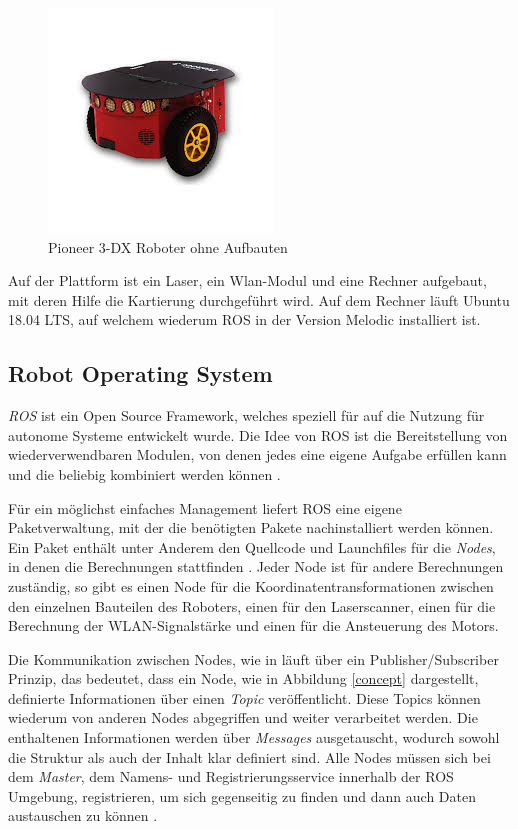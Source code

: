 \documentclass{scrartcl}%
\begin{document}
\begin{figure}[h]
	\centering
	\includegraphics{bilder/pioneerRoh.jpg}
	\caption{Pioneer 3-DX Roboter ohne Aufbauten \cite{pioneer}}
	\label{pioneerRoh}
\end{figure}

Auf der Plattform ist ein Laser, ein Wlan-Modul und eine Rechner aufgebaut, mit deren Hilfe die Kartierung durchgeführt wird. Auf dem Rechner läuft Ubuntu 18.04 LTS, auf welchem wiederum ROS in der Version Melodic installiert ist.

\subsection{Robot Operating System}
\textit{ROS} ist ein Open Source Framework, welches speziell für auf die Nutzung für autonome Systeme entwickelt wurde. Die Idee von ROS ist die Bereitstellung von wiederverwendbaren Modulen, von denen jedes eine eigene Aufgabe erfüllen kann und die beliebig kombiniert werden können \cite{rosIntro}.

Für ein möglichst einfaches Management liefert ROS eine eigene Paketverwaltung, mit der die benötigten Pakete nachinstalliert werden können. Ein Paket enthält unter Anderem den Quellcode und Launchfiles für die \textit{Nodes}, in denen die Berechnungen stattfinden \cite{rosIntro2}. Jeder Node ist für andere Berechnungen zuständig, so gibt es einen Node für die Koordinatentransformationen zwischen den einzelnen Bauteilen des Roboters, einen für den Laserscanner, einen für die Berechnung der WLAN-Signalstärke und einen für die Ansteuerung des Motors.

Die Kommunikation zwischen Nodes, wie in  läuft über ein Publisher/Subscriber Prinzip, das bedeutet, dass ein Node, wie in Abbildung \ref{concept} dargestellt, definierte Informationen über einen \textit{Topic} veröffentlicht. Diese Topics können wiederum von anderen Nodes abgegriffen und weiter verarbeitet werden. Die enthaltenen Informationen werden über \textit{Messages} ausgetauscht, wodurch sowohl die Struktur als auch der Inhalt klar definiert sind. Alle Nodes müssen sich bei dem \textit{Master}, dem Namens- und Registrierungsservice innerhalb der ROS Umgebung, registrieren, um sich gegenseitig zu finden und dann auch Daten austauschen zu können \cite{rosKonzept}.
\end{document}
